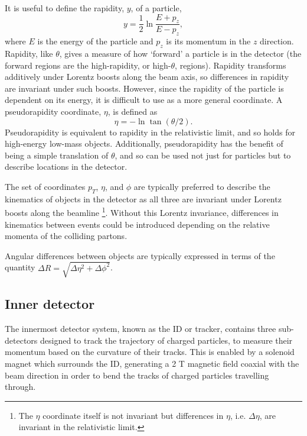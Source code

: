 It is useful to define the rapidity, $y$, of a particle,
\begin{equation*}
  y = \frac12 \ln\frac{E+p_z}{E-p_z},
\end{equation*}
where $E$ is the energy of the particle and $p_z$ is its momentum in the $z$
direction.
Rapidity, like $\theta$, gives a measure of how `forward' a particle is in the
detector (the forward regions are the high-rapidity, or high-$\theta$, regions).
Rapidity transforms additively under Lorentz boosts along the beam axis, so
differences in rapidity are invariant under such boosts. However, since the
rapidity of the particle is dependent on its energy, it is difficult to use
as a more general coordinate.
A pseudorapidity coordinate, $\eta$, is defined as
\begin{equation*}
  \eta = -\ln\tan(\theta/2).
\end{equation*}
Pseudorapidity is equivalent to rapidity in the relativistic limit, and so holds
for high-energy low-mass objects. Additionally, pseudorapidity has the benefit
of being a simple translation of $\theta$, and so can be used not just for
particles but to describe locations in the detector.

The set of coordinates $p_T$, $\eta$, and $\phi$ are typically preferred to
describe the kinematics of objects in the detector as all three are invariant under
Lorentz boosts along the beamline%
\footnote{
  The $\eta$ coordinate itself is not invariant but differences in $\eta$, i.e. $\Delta\eta$, are invariant in the relativistic limit.
}.
Without this Lorentz invariance, differences in kinematics between events could
be introduced depending on the relative momenta of the colliding partons.

Angular differences between objects are typically expressed in terms of the
quantity $\Delta R = \sqrt{\Delta\eta^2 + \Delta\phi^2}$.

\subsection{Inner detector}

The innermost detector system, known as the \ac{ID} or tracker, contains three
sub-detectors designed to track the trajectory of charged particles, to measure
their momentum based on the curvature of their tracks. This is enabled by a
solenoid magnet which surrounds the \ac{ID}, generating a 2 T magnetic field
coaxial with the beam direction in
order to bend the tracks of charged particles travelling through.

